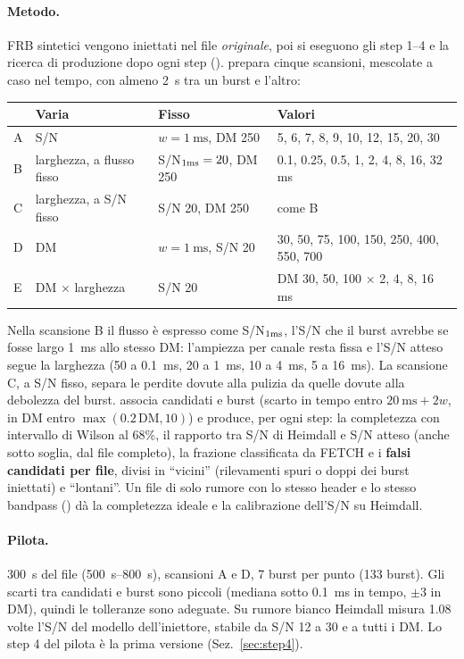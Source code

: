 \paragraph{Metodo.} FRB sintetici vengono iniettati nel file \emph{originale}, poi si eseguono gli step 1--4 e la ricerca
di produzione dopo ogni step ().  prepara cinque
scansioni, mescolate a caso nel tempo, con almeno \SI{2}{\second} tra un burst e l'altro:
\begin{center}
\small
\begin{tabular}{llll}
\toprule
 & Varia & Fisso & Valori \\
\midrule
A & S/N & $w=\SI{1}{\milli\second}$, DM 250 & 5, 6, 7, 8, 9, 10, 12, 15, 20, 30 \\
B & larghezza, a flusso fisso & S/N$_{\rm 1ms}=20$, DM 250 & 0.1, 0.25, 0.5, 1, 2, 4, 8, 16, 32 ms \\
C & larghezza, a S/N fisso & S/N 20, DM 250 & come B \\
D & DM & $w=\SI{1}{\milli\second}$, S/N 20 & 30, 50, 75, 100, 150, 250, 400, 550, 700 \\
E & DM $\times$ larghezza & S/N 20 & DM 30, 50, 100 $\times$ 2, 4, 8, 16 ms \\
\bottomrule
\end{tabular}
\end{center}
Nella scansione B il flusso è espresso come S/N$_{\rm 1ms}$, l'S/N che il burst avrebbe se fosse largo \SI{1}{\milli\second}
allo stesso DM: l'ampiezza per canale resta fissa e l'S/N atteso segue la larghezza (50 a \SI{0.1}{\milli\second}, 20 a
\SI{1}{\milli\second}, 10 a \SI{4}{\milli\second}, 5 a \SI{16}{\milli\second}). La scansione C, a S/N fisso, separa le
perdite dovute alla pulizia da quelle dovute alla debolezza del burst.  associa candidati e
burst (scarto in tempo entro $\SI{20}{\milli\second}+2w$, in DM entro $\max(0.2\,\mathrm{DM},10)$) e produce, per ogni
step: la completezza con intervallo di Wilson al 68\%, il rapporto tra S/N di Heimdall e S/N atteso (anche sotto soglia, dal
file  completo), la frazione classificata da FETCH e i \textbf{falsi candidati per file}, divisi in
``vicini'' (rilevamenti spuri o doppi dei burst iniettati) e ``lontani''. Un file di solo rumore con lo stesso header e lo
stesso bandpass () dà la completezza ideale e la calibrazione dell'S/N su Heimdall.

\paragraph{Pilota.} \SI{300}{\second} del file (\SIrange{500}{800}{\second}), scansioni A e D, 7 burst per punto
(133 burst). Gli scarti tra candidati e burst sono piccoli (mediana sotto \SI{0.1}{\milli\second} in tempo, $\pm3$ in
DM), quindi le tolleranze sono adeguate. Su rumore bianco Heimdall misura 1.08 volte l'S/N del modello dell'iniettore,
stabile da S/N 12 a 30 e a tutti i DM. Lo step 4 del pilota è la prima versione (Sez.~\ref{sec:step4}).

